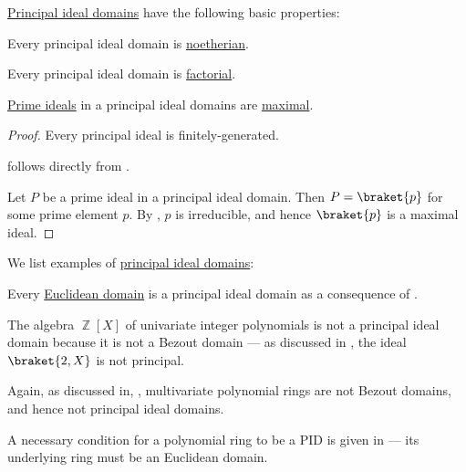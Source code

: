 \begin{proposition}\label{thm:def:principal_ideal_domain}
  \hyperref[def:principal_ideal_domain]{Principal ideal domains} have the following basic properties:
  \begin{thmenum}
     Every principal ideal domain is \hyperref[def:noetherian_semiring]{noetherian}.

     Every principal ideal domain is \hyperref[def:factorial_domain]{factorial}.

     \hyperref[def:semiring_ideal/prime]{Prime ideals} in a principal ideal domains are \hyperref[def:semiring_ideal/maximal]{maximal}.
  \end{thmenum}
\end{proposition}
\begin{proof}
   Every principal ideal is finitely-generated.

    follows directly from .

   Let \( P \) be a prime ideal in a principal ideal domain. Then \( P = \braket{ p } \) for some prime element \( p \). By , \( p \) is irreducible, and hence \( \braket{ p } \) is a maximal ideal.
\end{proof}

\begin{example}\label{ex:def:principal_ideal_domain}
  We list examples of \hyperref[def:principal_ideal_domain]{principal ideal domains}:
  \begin{thmenum}
     Every \hyperref[def:euclidean_domain]{Euclidean domain} is a principal ideal domain as a consequence of .

     The algebra \( \BbbZ[X] \) of univariate integer polynomials is not a principal ideal domain because it is not a Bezout domain --- as discussed in , the ideal \( \braket{ 2, X } \) is not principal.

     Again, as discussed in, , multivariate polynomial rings are not Bezout domains, and hence not principal ideal domains.

    A necessary condition for a polynomial ring to be a PID is given in  --- its underlying ring must be an Euclidean domain.
  \end{thmenum}
\end{example}

